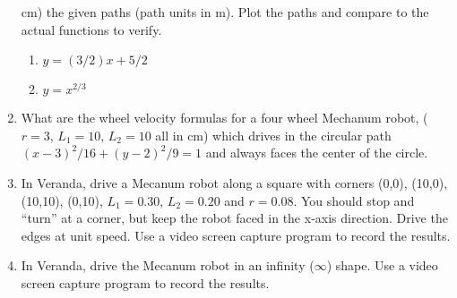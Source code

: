 \begin{enumerate}
  cm) the given paths (path units in m). Plot the paths and compare to
  the actual functions to verify.

  \begin{enumerate}
  \def\labelenumii{\alph{enumii}.}
  \tightlist
  \item
    \(y=(3/2)x + 5/2\)
  \item
    \(y = x^{2/3}\)
  \end{enumerate}
\item
  What are the wheel velocity formulas for a four wheel Mechanum robot,
  (\(r=3\), \(L_1 = 10\), \(L_2=10\) all in cm) which drives in the
  circular path \((x-3)^2/16 + (y-2)^2/9 = 1\) and always faces the
  center of the circle.
\item
  In Veranda, drive a Mecanum robot along a square with corners (0,0),
  (10,0), (10,10), (0,10), \(L_1 = 0.30\), \(L_2 = 0.20\) and
  \(r=0.08\). You should stop and ``turn'' at a corner, but keep the
  robot faced in the x-axis direction. Drive the edges at unit speed.
  Use a video screen capture program to record the results.
\item
  In Veranda, drive the Mecanum robot in an infinity (\(\infty\)) shape.
  Use a video screen capture program to record the results.
\end{enumerate}
